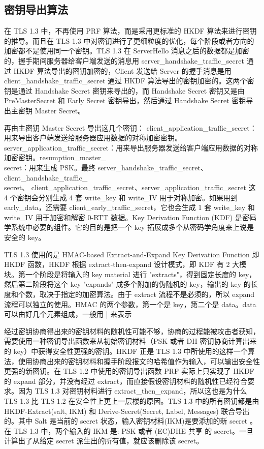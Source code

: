 \subsection{密钥导出算法}

在 TLS 1.3 中，不再使用 PRF 算法，而是采用更标准的 HKDF 算法来进行密钥的推导。而且在 TLS 1.3 中对密钥进行了更细粒度的优化，每个阶段或者方向的加密都不是使用同一个密钥。TLS 1.3 在 ServerHello 消息之后的数据都是加密的，握手期间服务器给客户端发送的消息用 server\_handshake\_traffic\_secret 通过 HKDF 算法导出的密钥加密的，Client 发送给 Server 的握手消息是用 client\_handshake\_traffic\-\_secret 通过 HKDF 算法导出的密钥加密的。这两个密钥是通过 Handshake Secret 密钥来导出的，而 Handshake Secret 密钥又是由 PreMasterSecret 和 Early Secret 密钥导出，然后通过 Handshake Secret 密钥导出主密钥 Master Secret。

再由主密钥 Master Secret 导出这几个密钥： client\_application\_traffic\_secret：用来导出客户端发送给服务器应用数据的对称加密密钥。server\_application\_traffic\_s\-ecret：用来导出服务器发送给客户端应用数据的对称加密密钥。resumption\_master\_\\secret：用来生成 PSK。最终 server\_handshake\_traffic\_secret、client\_handshake\_traffic\_\\secret、 client\_application\_\-traffic\_secret、server\_application\_traffic\_secret 这 4 个密钥会分别生成 4 套 write\_key 和 write\_IV 用于对称加密。如果用到 early\_data，还需要 client\_e\-arly\_traffic\_secret，它也会生成 1 套 write\_key 和 write\_IV 用于加密和解密 0-RTT 数据。Key Derivation Function (KDF) 是密码学系统中必要的组件。它的目的是把一个 key 拓展成多个从密码学角度来上说是安全的 key。

TLS 1.3 使用的是 HMAC-based Extract-and-Expand Key Derivation Function 即 HKDF 函数，HKDF 根据 extract-then-expand 设计模式，即 KDF 有 2 大模块。第一个阶段是将输入的 key material 进行 "extracts"，得到固定长度的 key，然后第二阶段将这个 key "expands" 成多个附加的伪随机的 key，输出的 key 的长度和个数，取决于指定的加密算法。由于 extract 流程不是必须的，所以 expand 流程可以独立的使用。HMAC 的两个参数，第一个是 key，第二个是 data。data 可以由好几个元素组成，一般用 | 来表示

经过密钥协商得出来的密钥材料的随机性可能不够，协商的过程能被攻击者获知，需要使用一种密钥导出函数来从初始密钥材料（PSK 或者 DH 密钥协商计算出来的 key）中获得安全性更强的密钥。HKDF 正是 TLS 1.3 中所使用的这样一个算法，使用协商出来的密钥材料和握手阶段报文的哈希值作为输入，可以输出安全性更强的新密钥。在 TLS 1.2 中使用的密钥导出函数 PRF 实际上只实现了 HKDF 的 expand 部分，并没有经过 extract，而直接假设密钥材料的随机性已经符合要求。因为 TLS 1.3 对密钥材料进行 extract\_then\_expand，所以这也是为什么 TLS 1.3 比 TLS 1.2 在安全性上更上一层楼的原因。TLS 1.3 中的所有密钥都是由 HKDF-Extract(salt, IKM) 和 Derive-Secret(Secret, Label, Messages) 联合导出的。其中 Salt 是当前的 secret 状态，输入密钥材料(IKM)是要添加的新 secret 。在 TLS 1.3 中，两个输入的 IKM 是: PSK 或者 (EC)DHE 共享 的 secret。一旦计算出了从给定 secret 派生出的所有值，就应该删除该 secret。

